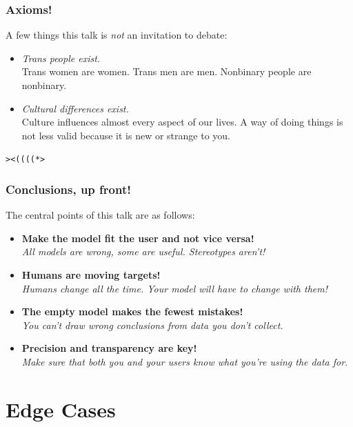 \documentclass[aspectratio=169,x11names]{beamer}
\begin{document}
\begin{frame}
\frametitle{Axioms!}
A few things this talk is \emph{not} an invitation to debate:
\bigskip

\begin{itemize}
\item\emph{Trans people exist.}\\
Trans women are women. Trans men are men. Nonbinary people are nonbinary.
\medskip

\item\emph{Cultural differences exist.}\\
Culture influences almost every aspect of our lives. A way of doing things is not less valid because it is new or strange to you.
\end{itemize}
\bigskip

\huge
\begin{center}
\texttt{><((((*>}
\end{center}

\end{frame}

\begin{frame}
\frametitle{Conclusions, up front!}
\large
The central points of this talk are as follows:\bigskip

\begin{itemize}
\pause\item \textbf{Make the model fit the user and not vice versa!}\\
\emph{All models are wrong, some are useful. Stereotypes aren't!}\medskip
\pause\item \textbf{Humans are moving targets!}\\
\emph{Humans change all the time. Your model will have to change with them!}\medskip
\pause\item \textbf{The empty model makes the fewest mistakes!}\\
\emph{You can't draw wrong conclusions from data you don't collect.}\medskip
\pause\item \textbf{Precision and transparency are key!}\\
\emph{Make sure that both you and your users know what you're using the data for.}
\end{itemize}
\end{frame}


\section{Edge Cases}
\end{document}
